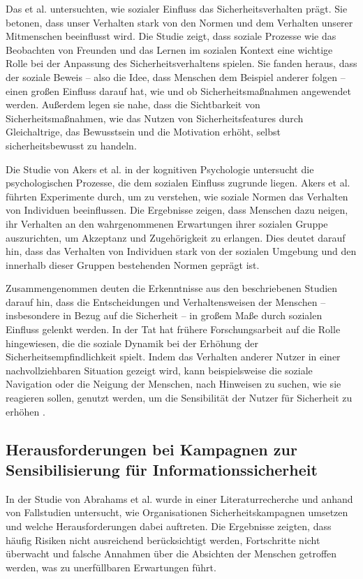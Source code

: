 \documentclass[german,report]{i1thesis}
\begin{document}
Das et al. \cite{185300} untersuchten, wie sozialer Einfluss das Sicherheitsverhalten prägt. Sie betonen, dass unser Verhalten stark von den Normen und dem Verhalten unserer Mitmenschen beeinflusst wird. Die Studie zeigt, dass soziale Prozesse wie das Beobachten von Freunden und das Lernen im sozialen Kontext eine wichtige Rolle bei der Anpassung des Sicherheitsverhaltens spielen. Sie fanden heraus, dass der soziale Beweis – also die Idee, dass Menschen dem Beispiel anderer folgen – einen großen Einfluss darauf hat, wie und ob Sicherheitsmaßnahmen angewendet werden. Außerdem legen sie nahe, dass die Sichtbarkeit von Sicherheitsmaßnahmen, wie das Nutzen von Sicherheitsfeatures durch Gleichaltrige, das Bewusstsein und die Motivation erhöht, selbst sicherheitsbewusst zu handeln.

Die Studie von Akers et al. \cite{akers1995social} in der kognitiven Psychologie untersucht die psychologischen Prozesse, die dem sozialen Einfluss zugrunde liegen. Akers et al. \cite{akers1995social} führten Experimente durch, um zu verstehen, wie soziale Normen das Verhalten von Individuen beeinflussen. Die Ergebnisse zeigen, dass Menschen dazu neigen, ihr Verhalten an den wahrgenommenen Erwartungen ihrer sozialen Gruppe auszurichten, um Akzeptanz und Zugehörigkeit zu erlangen. Dies deutet darauf hin, dass das Verhalten von Individuen stark von der sozialen Umgebung und den innerhalb dieser Gruppen bestehenden Normen geprägt ist.

Zusammengenommen deuten die Erkenntnisse aus den beschriebenen Studien darauf hin, dass die Entscheidungen und Verhaltensweisen der Menschen – insbesondere in Bezug auf die Sicherheit – in großem Maße durch sozialen Einfluss gelenkt werden. In der Tat hat frühere Forschungsarbeit \cite{yazdanmehr2020peers} auf die Rolle hingewiesen, die die soziale Dynamik bei der Erhöhung der Sicherheitsempfindlichkeit spielt. Indem das Verhalten anderer Nutzer in einer nachvollziehbaren Situation gezeigt wird, kann beispielsweise die soziale Navigation oder die Neigung der Menschen, nach Hinweisen zu suchen, wie sie reagieren sollen, genutzt werden, um die Sensibilität der Nutzer für Sicherheit zu erhöhen \cite{yazdanmehr2020peers}.

\subsection{Herausforderungen bei Kampagnen zur Sensibilisierung für Informationssicherheit}

In der Studie von Abrahams et al. \cite{abrahams2024cybersecurity} wurde in einer Literaturrecherche und anhand von Fallstudien untersucht, wie Organisationen Sicherheitskampagnen umsetzen und welche Herausforderungen dabei auftreten. Die Ergebnisse zeigten, dass häufig Risiken nicht ausreichend berücksichtigt werden, Fortschritte nicht überwacht und falsche Annahmen über die Absichten der Menschen getroffen werden, was zu unerfüllbaren Erwartungen führt.
\end{document}
